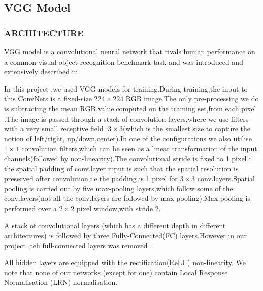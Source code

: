 \documentclass[10pt,a4paper]{ctexart}
\begin{document}
	\subsection{VGG Model}
	\subsubsection{ARCHITECTURE}
	
	VGG model is a convolutional neural network that rivals human performance 
	on a common visual object recognition benchmark task and was introduced and 
	extensively described in\cite{Simonyan2014Very}. 
	
	In this project ,we used VGG\cite{Simonyan2014Very} models for training.During training,the input
	to this ConvNets is a fixed-size $224\times224$ RGB image.The only pre-processing we do is subtracting the mean RGB value,computed on the training set,from each pixel .The image is passed through a stack of 
	convolution layers,where we use filters with a very small receptive field
	:$3\times 3$(which is the smallest size to capture the notion of left/right,
	up/down,center).In one of the configurations we also utilise $1\times1$ convolution filters,which can be seen as a linear transformation of the
	input channels(followed by non-linearity).The convolutional stride is fixed 
	to 1 pixel ; the spatial padding of conv.layer input is such that the spatial
	resolution is preserved after convolution,i.e.the padding is 1 pixel for $3\times 3$ conv.layers.Spatial pooling is carried out by five max-pooling
	layers,which follow some of the conv.layers(not all the conv.layers are followed by max-pooling).Max-pooling is performed over a $2\times 2$ pixel 
	window,with stride 2.
	
	A stack of convolutional layers (which has a different depth in different 
	architectures) is followed by three Fully-Connected(FC) layers.However in our 
	project ,teh full-connected layers was removed .
	
	All hidden layers are equipped with the rectification(ReLU) non-linearity.
	We note that none of our networks (except for one) contain Local Response
	Normalisation (LRN) normalisation.
	
\end{document}
